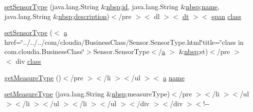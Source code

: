 \begin{DoxyCompactItemize}
\item 
\hyperlink{_sensor_8html_a214e74d50a2d41b300e1ccf4e1225a5f}{set\-Sensor\-Type} (java.\-lang.\-String \&\hyperlink{_tools_8html_aef915316f784c9063d942974538301a6}{nbsp};\hyperlink{index-9_8html_aa9b8ff1d03b739d1e752b9d9a5aa7c98}{id}, java.\-lang.\-String \&\hyperlink{_tools_8html_aef915316f784c9063d942974538301a6}{nbsp};\hyperlink{_cloudia_d_b_8html_ab74e6bf80237ddc4109968cedc58c151}{name}, java.\-lang.\-String \&\hyperlink{_tools_8html_aef915316f784c9063d942974538301a6}{nbsp};\hyperlink{_cloudia_d_b_8html_a2661f439a4a94ffdcd5e47ae1da0bb1d}{description})$<$/pre $>$$<$ dl $>$$<$ \hyperlink{stylesheet_8css_a107565fb4039d33b041380d6e0ea1d80}{dt} $>$$<$ \hyperlink{stylesheet_8css_a8343996ebcf16220b04e54659aac31cc}{span} \hyperlink{_tools_8html_acf06f836132665ba8114f5a414c2403f}{class}
\item 
\hyperlink{_sensor_8html_a759951db743629edb68691dfae77bd7a}{set\-Sensor\-Type} ($<$ \hyperlink{style_8css_a5e8981582017bb8b84c21f148345d1f7}{a} href=\char`\"{}../../../com/cloudia/Business\-Class/Sensor.\-Sensor\-Type.\-html\char`\"{}title=\char`\"{}class in com.\-cloudia.\-Business\-Class\char`\"{}$>$Sensor.\-Sensor\-Type$<$/\hyperlink{style_8css_a5e8981582017bb8b84c21f148345d1f7}{a} $>$ \&\hyperlink{_tools_8html_aef915316f784c9063d942974538301a6}{nbsp};st)$<$/pre $>$$<$ div \hyperlink{_tools_8html_acf06f836132665ba8114f5a414c2403f}{class}
\item 
\hyperlink{_sensor_8html_a42caf1d6fee872a4cecf11051fa4563e}{get\-Measure\-Type} ()$<$/pre $>$$<$/li $>$$<$/ul $>$$<$ \hyperlink{style_8css_a5e8981582017bb8b84c21f148345d1f7}{a} \hyperlink{_cloudia_d_b_8html_ab74e6bf80237ddc4109968cedc58c151}{name}
\item 
\hyperlink{_sensor_8html_ab85248e64b155a8db2cf0c9fa19c4ee5}{set\-Measure\-Type} (java.\-lang.\-String \&\hyperlink{_tools_8html_aef915316f784c9063d942974538301a6}{nbsp};measure\-Type)$<$/pre $>$$<$/li $>$$<$/ul $>$$<$/li $>$$<$/ul $>$$<$/li $>$$<$/ul $>$$<$/div $>$$<$/div $>$$<$!-\/-\/
\end{DoxyCompactItemize}
